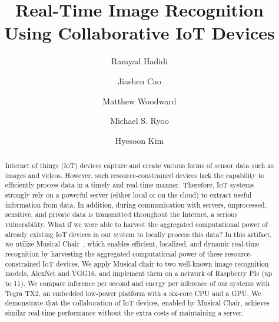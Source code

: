 \documentclass[sigplan]{acmart}
\begin{document}
\title{Real-Time Image Recognition Using Collaborative IoT Devices}

\author{Ramyad Hadidi}

\author{Jiashen Cao}

\author{Matthew Woodward}

\author{Michael S. Ryoo}
\affiliation{\institution{ }}

\author{Hyesoon Kim}

\renewcommand{\shortauthors}{}
\renewcommand{\shorttitle}{}

\maketitle


\begin{abstract}
%
Internet of things (IoT) devices capture and create various forms of sensor data such as images and videos. However, such resource-constrained devices lack the capability to efficiently process data in a timely and real-time manner. Therefore, IoT systems strongly rely on a powerful server (either local or on the cloud) to extract useful information from data. In addition, during communication with servers, unprocessed, sensitive, and private data is transmitted throughout the Internet, a serious vulnerability. What if we were able to harvest the aggregated computational power of already existing IoT devices in our system to locally process this data? In this artifact, we utilize Musical Chair~\cite{musical-chair}, which enables efficient, localized, and dynamic real-time recognition by harvesting the aggregated computational power of these resource-constrained IoT devices. We apply Musical chair to two well-known image recognition models, AlexNet and VGG16, and implement them on a network of Raspberry PIs (up to 11). We compare inference per second and energy per inference of our systems with Tegra TX2, an embedded low-power platform with a six-core CPU and a GPU. We demonstrate that the collaboration of IoT devices, enabled by Musical Chair, achieves similar real-time performance without the extra costs of maintaining a server. 
%
\end{abstract}
\end{document}
